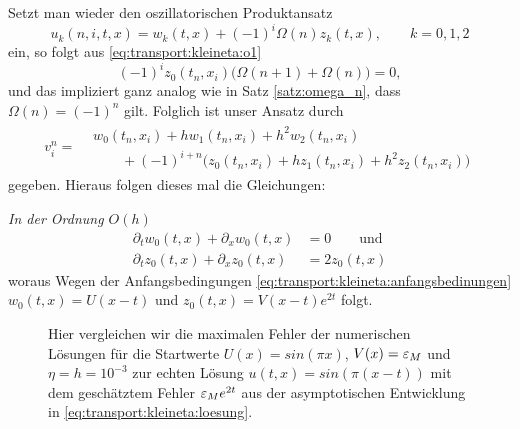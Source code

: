 Setzt man wieder den oszillatorischen Produktansatz
\[ u_k(n, i, t, x) = w_k(t, x) + (-1)^i \Omega(n) z_k(t, x), \qquad k = 0,1,2 \]
ein, so folgt aus \eqref{eq:transport:kleineta:o1}
\[ (-1)^i z_0(t_n, x_i) \bigl( \Omega(n+1) + \Omega(n) \bigr) = 0, \]
und das impliziert ganz analog wie in Satz \ref{satz:omega_n}, dass $\Omega(n) = (-1)^n$ gilt.
Folglich ist unser Ansatz durch
\begin{align}
v^n_i = \begin{split}
&w_0(t_n, x_i) + h w_1(t_n, x_i) + h^2 w_2(t_n, x_i)\\
&\qquad + (-1)^{i+n} \bigl( z_0(t_n, x_i) + h z_1(t_n, x_i) + h^2 z_2(t_n, x_i) \bigr)
\end{split}
\end{align}
gegeben. Hieraus folgen dieses mal die Gleichungen:

\vspace{0.4cm}
\noindent \emph{In der Ordnung $O(h)$}
\begin{align*}
\partial_t w_0(t, x) + \partial_x w_0(t, x) &= 0 \qquad \text{und}\\
\partial_t z_0(t, x) + \partial_x z_0(t, x) &= 2 z_0(t, x)
\end{align*}
woraus Wegen der Anfangsbedingungen \eqref{eq:transport:kleineta:anfangsbedinungen} $w_0(t,x) = U(x -t)$ und $z_0(t,x) = V(x - t) e^{2 t}$ folgt.

\begin{figure}
\centering
{}
\caption{Hier vergleichen wir die maximalen Fehler der numerischen Lösungen für die Startwerte $U(x) = sin(\pi x)$, $V(x) = \varepsilon_M$ und $\eta = h = 10^{-3}$ zur echten Lösung $u(t,x) = sin(\pi(x - t))$ mit dem geschätztem Fehler $\varepsilon_M e^{2t}$ aus der asymptotischen Entwicklung in \eqref{eq:transport:kleineta:loesung}.}
\label{fig:transport:kleineta:max_error}
\end{figure}


